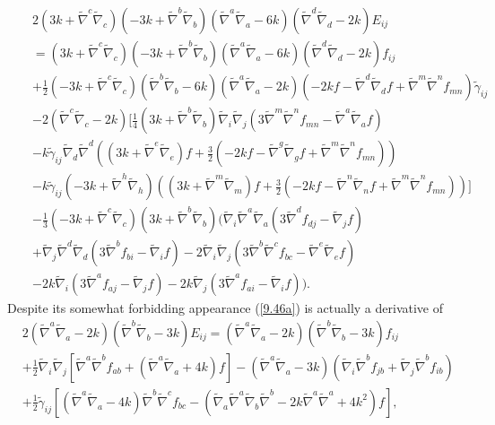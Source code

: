 %
\begin{eqnarray}
&&2(3k+\tilde{\nabla}^c\tilde{\nabla}_c)(-3k+\tilde{\nabla}^b\tilde{\nabla}_b)(\tilde{\nabla}^a\tilde{\nabla}_a-6k)(\tilde{\nabla}^d\tilde{\nabla}_d-2k)E_{ij}
\nonumber
\\
&&=(3k+\tilde{\nabla}^c\tilde{\nabla}_c)(-3k+\tilde{\nabla}^b\tilde{\nabla}_b)(\tilde{\nabla}^a\tilde{\nabla}_a-6k)(\tilde{\nabla}^d\tilde{\nabla}_d-2k)f_{ij}
\nonumber
\\
&&+\frac{1}{2}(-3k+\tilde{\nabla}^c\tilde{\nabla}_c)(\tilde{\nabla}^b\tilde{\nabla}_b-6k)(\tilde{\nabla}^a\tilde{\nabla}_a-2k)(-2kf-\tilde{\nabla}^d\tilde{\nabla}_df+\tilde{\nabla}^m\tilde{\nabla}^nf_{mn}) \tilde{\gamma}_{ij}
\nonumber
\\
&&-2(\tilde{\nabla}^c\tilde{\nabla}_c-2k)\Bigg[\frac{1}{4}(3k+\tilde{\nabla}^b\tilde{\nabla}_b)\tilde{\nabla}_i\tilde{\nabla}_j\left(3\tilde{\nabla}^m\tilde{\nabla}^nf_{mn}-\tilde{\nabla}^a\tilde{\nabla}_af\right)
\nonumber
\\
&&-k\tilde{\gamma}_{ij}\tilde{\nabla}_d\tilde{\nabla}^d((3k+\tilde{\nabla}^e\tilde{\nabla}_e)f+\frac{3}{2}(-2kf-\tilde{\nabla}^g\tilde{\nabla}_gf+\tilde{\nabla}^m\tilde{\nabla}^nf_{mn}))
\nonumber
\\
&&-k\tilde{\gamma}_{ij}(-3k+\tilde{\nabla}^h\tilde{\nabla}_h)((3k+\tilde{\nabla}^m\tilde{\nabla}_m)f+\frac{3}{2}(-2kf-\tilde{\nabla}^n\tilde{\nabla}_nf+\tilde{\nabla}^m\tilde{\nabla}^nf_{mn}))\Bigg]
\nonumber
\\
&&-\frac{1}{3}(-3k+\tilde{\nabla}^c\tilde{\nabla}_c)(3k+\tilde{\nabla}^b\tilde{\nabla}_b)\Bigg(\tilde{\nabla}_i\tilde{\nabla}^a\tilde{\nabla}_a(3\tilde{\nabla}^df_{dj}-\tilde{\nabla}_jf)
\nonumber
\\
&&+\tilde{\nabla}_j\tilde{\nabla}^d\tilde{\nabla}_d(3\tilde{\nabla}^bf_{bi}-\tilde{\nabla}_if)-2\tilde{\nabla}_i\tilde{\nabla}_j(3\tilde{\nabla}^b\tilde{\nabla}^cf_{bc}-\tilde{\nabla}^e\tilde{\nabla}_ef)
\nonumber
\\
&&-2k\tilde{\nabla}_i(3\tilde{\nabla}^af_{aj}-\tilde{\nabla}_jf)-2k\tilde{\nabla}_j(3\tilde{\nabla}^af_{ai}-\tilde{\nabla}_if)\Bigg).
\label{9.46a}
\end{eqnarray}
%
Despite its somewhat forbidding appearance (\ref{9.46a}) is actually a derivative of 
%
\begin{align}
&2(\tilde{\nabla}^a\tilde{\nabla}_a-2k)(\tilde{\nabla}^b\tilde{\nabla}_b-3k)E_{ij}
=(\tilde{\nabla}^a\tilde{\nabla}_a-2k)(\tilde{\nabla}^b\tilde{\nabla}_b-3k)f_{ij}
\nonumber\\
&+\tfrac{1}{2}\tilde{\nabla}_i\tilde{\nabla}_j\left[\tilde{\nabla}^a\tilde{\nabla}^bf_{ab}+(\tilde{\nabla}^a\tilde{\nabla}_a+4k)f\right]-(\tilde{\nabla}^a\tilde{\nabla}_a-3k)(\tilde{\nabla}_i\tilde{\nabla}^bf_{jb}+\tilde{\nabla}_j\tilde{\nabla}^bf_{ib})
\nonumber\\
&+\tfrac{1}{2}\tilde{\gamma}_{ij}\left[(\tilde{\nabla}^a\tilde{\nabla}_a-4k)\tilde{\nabla}^b\tilde{\nabla}^cf_{bc}
-(\tilde{\nabla}_a\tilde{\nabla}^a\tilde{\nabla}_b\tilde{\nabla}^b-2k\tilde{\nabla}^a\tilde{\nabla}^a+4k^2)f\right],
\label{9.47a}
\end{align}
